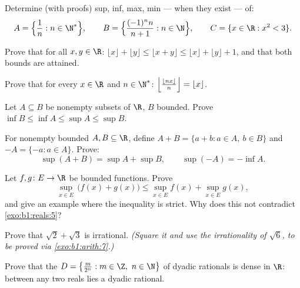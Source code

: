 \begin{exercise}[$\star$]\label{exo:b1:reals:1}
Determine (with proofs) sup, inf, max, min --- when they exist --- of:
\[
A = \Bigl\{\frac{1}{n} : n \in \N^*\Bigr\},
\qquad
B = \Bigl\{\frac{(-1)^n n}{n+1} : n \in \N\Bigr\},
\qquad
C = \{x \in \R : x^2 < 3\}.
\]
\end{exercise}

\begin{exercise}[$\star$]\label{exo:b1:reals:2}
Prove that for all $x, y \in \R$: $\lfloor x \rfloor + \lfloor y
\rfloor \leq \lfloor x + y \rfloor \leq \lfloor x \rfloor + \lfloor y
\rfloor + 1$, and that both bounds are attained.
\end{exercise}

\begin{exercise}[$\star$]\label{exo:b1:reals:3}
Prove that for every $x \in \R$ and $n \in \N^*$:
$\Bigl\lfloor \frac{\lfloor nx \rfloor}{n} \Bigr\rfloor = \lfloor x
\rfloor$.
\end{exercise}

\begin{exercise}[$\star$]\label{exo:b1:reals:4}
Let $A \subseteq B$ be nonempty subsets of $\R$, $B$ bounded. Prove
$\inf B \leq \inf A \leq \sup A \leq \sup B$.
\end{exercise}

\begin{exercise}[$\star\star$]\label{exo:b1:reals:5}
For nonempty bounded $A, B \subseteq \R$, define $A + B = \{a + b : a
\in A,\ b \in B\}$ and $-A = \{-a : a \in A\}$. Prove:
\[
\sup(A + B) = \sup A + \sup B,
\qquad
\sup(-A) = -\inf A .
\]
\end{exercise}

\begin{exercise}[$\star\star$]\label{exo:b1:reals:6}
Let $f, g \colon E \to \R$ be bounded functions. Prove
\[
\sup_{x \in E}\, \bigl(f(x) + g(x)\bigr) \leq \sup_{x \in E} f(x) +
\sup_{x \in E} g(x),
\]
and give an example where the inequality is strict. Why does this not
contradict \cref{exo:b1:reals:5}?
\end{exercise}

\begin{exercise}[$\star\star$]\label{exo:b1:reals:7}
Prove that $\sqrt 2 + \sqrt 3$ is irrational. \emph{(Square it and
use the irrationality of $\sqrt 6$, to be proved via
\cref{exo:b1:arith:7}.)}
\end{exercise}

\begin{exercise}[$\star\star$]\label{exo:b1:reals:8}
Prove that the  $D = \bigl\{\frac{m}{2^n} : m \in \Z,\ n \in
\N\bigr\}$ of dyadic rationals is dense in $\R$: between any two
reals lies a dyadic rational.
\end{exercise}

